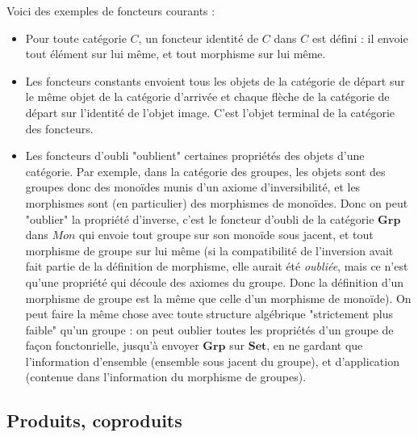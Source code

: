 \documentclass{article}
\begin{document}
Voici des exemples de foncteurs courants : 
\begin{itemize}
    \item Pour toute catégorie $C$, un foncteur identité de $C$ dans $C$ est défini : il envoie tout élément sur lui même, et tout morphisme sur lui même. 
    \item Les foncteurs constants  envoient tous les objets de la catégorie de départ sur le même objet de la catégorie d'arrivée et  chaque flèche de la catégorie de départ sur l'identité de l'objet image. C'est l'objet terminal de la catégorie des foncteurs.
    \item Les foncteurs d'oubli "oublient" certaines propriétés des objets d'une catégorie. Par exemple, dans la catégorie des groupes, les objets sont des groupes donc des monoïdes munis d'un axiome d'inversibilité, et les morphismes sont (en particulier) des morphismes de monoïdes. Donc on peut "oublier" la propriété d'inverse, c'est le foncteur d'oubli de la catégorie $\mathbf{Grp}$ dans $Mon$ qui envoie tout groupe sur son monoïde sous jacent, et tout morphisme de groupe sur lui même (si la compatibilité de l'inversion avait fait partie de la définition de morphisme, elle aurait été \textit{oubliée}, mais ce n'est qu'une propriété qui découle des axiomes du groupe. Donc la définition d'un morphisme de groupe est la même que celle d'un morphisme de monoïde). On peut faire la même chose avec toute structure algébrique "strictement plus faible" qu'un groupe : on peut oublier toutes les propriétés d'un groupe de façon fonctonrielle, jusqu'à envoyer $\mathbf{Grp}$ sur $\mathbf{Set}$, en ne gardant que l'information d'ensemble (ensemble sous jacent du groupe), et d'application (contenue dans l'information du morphisme de groupes). 
\end{itemize}

\subsection{Produits, coproduits}
\end{document}
